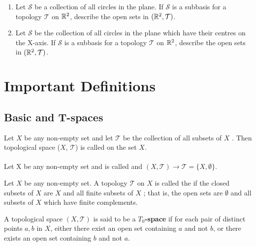 \documentclass[10pt,a4paper]{report}
\newcommand{\TT}{\mathcal{T}}
\newcommand{\SB}{\mathcal{S}}
\begin{document}
\begin{enumerate}
\item Let $\SB$ be a collection of all circles in the plane. If $\SB$ is a subbasis for a topology $\TT$ on $\mathbb{R}^2$, describe the open sets in $(\R^2, \TT)$.

\item Let $\SB$ be the collection of all circles in the plane which have their centres on the X-axis.  If $\SB$ is a subbasis for a topology $\TT$ on $\mathbb{R}^2$, describe the open sets in $(\R^2, \TT)$.

\end{enumerate} %

\chapter{Important Definitions}

\section{Basic and T-spaces}

\begin{definition}Let $X$ be any non-empty set and let $\TT$ be the collection of all subsets of $X$ . Then topological space ($X$, $\TT$) is called  on the set $X$.\\
\\
Let X be any non-empty set and is called  and $(X, \TT) \to \TT = \{X, \emptyset\}$.
\end{definition}

\begin{definition}Let $X$ be any non-empty set. A topology $\TT$ on $X$ is called the  if the closed subsets
of $X$ are $X$ and all finite subsets of $X$ ; that is, the open sets are $\emptyset$ and all subsets of $X$ which have finite complements.
\end{definition}

\begin{definition}
\end{definition}

\begin{definition}[$T_0$ Spaces]A topological space $(X,\TT)$ is said to be a \textbf{$T_0$-space} if for each pair of distinct points $a,b$ in $X$, either there exist an open set containing $a$ and not $b$, or there exists an open set containing $b$ and not $a$.
\end{definition}
\end{document}
